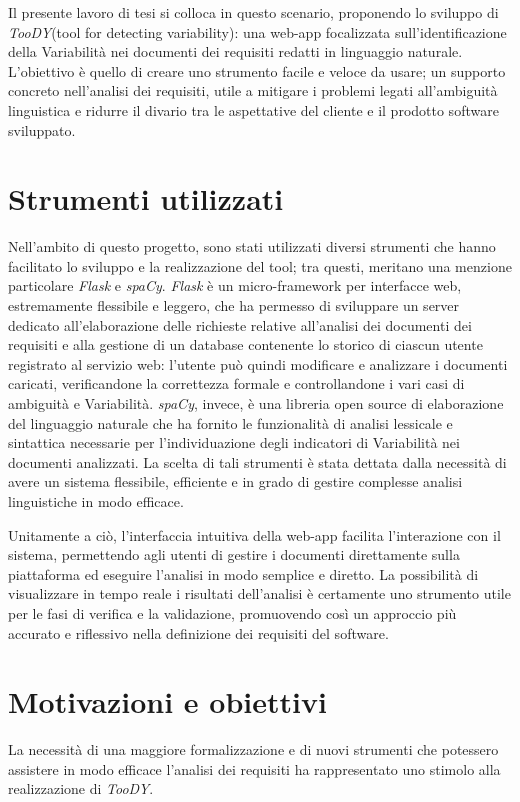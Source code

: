 \documentclass[12pt]{report}
\newcommand{\toody}{\textsl{TooDY}\xspace}
\newcommand{\flask}{\textsl{Flask}\xspace}
\newcommand{\spacy}{\textsl{spaCy}\xspace}
\begin{document}
Il presente lavoro di tesi si colloca in questo scenario, proponendo lo sviluppo di \toody (tool for detecting variability): una web-app focalizzata sull’identificazione della Variabilità nei documenti dei requisiti redatti in linguaggio naturale. L’obiettivo è quello di creare uno strumento facile e veloce da usare; un supporto concreto nell’analisi dei requisiti, utile a mitigare i problemi legati all’ambiguità linguistica e ridurre il divario tra le aspettative del cliente e il prodotto software sviluppato.


\section{Strumenti utilizzati}
Nell’ambito di questo progetto, sono stati utilizzati diversi strumenti che hanno facilitato lo sviluppo e la realizzazione del tool; tra questi, meritano una menzione particolare \flask e \spacy. \flask è un micro-framework per interfacce web, estremamente flessibile e leggero, che ha permesso di sviluppare un server dedicato all’elaborazione delle richieste relative all’analisi dei documenti dei requisiti e alla gestione di un database contenente lo storico di ciascun utente registrato al servizio web: l'utente può quindi modificare e analizzare i documenti caricati, verificandone la correttezza formale e controllandone i vari casi di ambiguità e Variabilità. \spacy, invece, è una libreria open source di elaborazione del linguaggio naturale che ha fornito le funzionalità di analisi lessicale e sintattica necessarie per l’individuazione degli indicatori di Variabilità nei documenti analizzati. La scelta di tali strumenti è stata dettata dalla necessità di avere un sistema flessibile, efficiente e in grado di gestire complesse analisi linguistiche in modo efficace.

Unitamente a ciò, l'interfaccia intuitiva della web-app facilita l'interazione con il sistema, permettendo agli utenti di gestire i documenti direttamente sulla piattaforma ed eseguire l'analisi in modo semplice e diretto. La possibilità di visualizzare in tempo reale i risultati dell'analisi è certamente uno strumento utile per le fasi di verifica e la validazione, promuovendo così un approccio più accurato e riflessivo nella definizione dei requisiti del software.


\section{Motivazioni e obiettivi}
La necessità di una maggiore formalizzazione e di nuovi strumenti che potessero assistere in modo efficace l'analisi dei requisiti ha rappresentato uno stimolo alla realizzazione di \toody.
\end{document}
